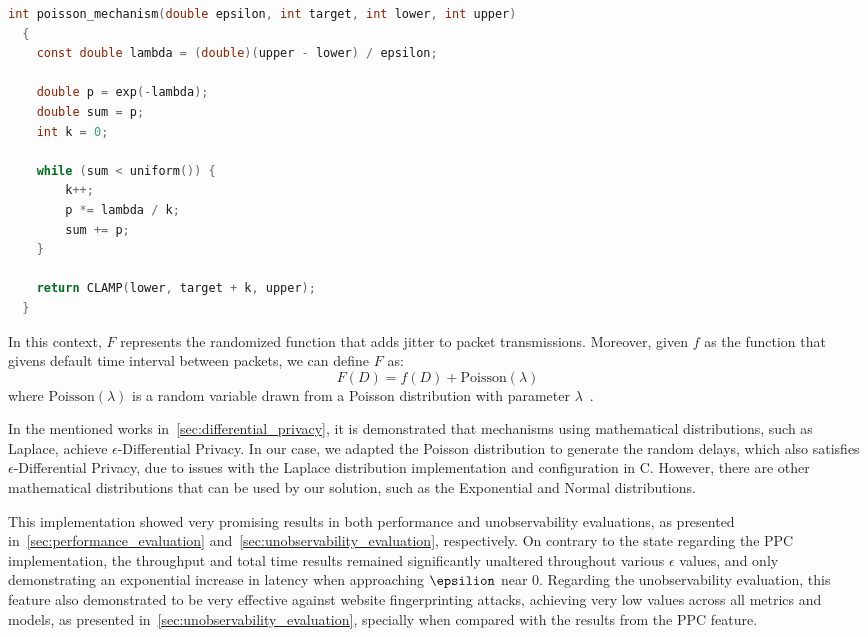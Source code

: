 \begin{lstlisting}[language=C, caption={Poisson Distribution Pseudo-Random Number Generator implementation.}, label={lst:poisson_distribution}]
  int poisson_mechanism(double epsilon, int target, int lower, int upper)
  {
    const double lambda = (double)(upper - lower) / epsilon;

    double p = exp(-lambda);
    double sum = p;
    int k = 0;

    while (sum < uniform()) {
        k++;
        p *= lambda / k;
        sum += p;
    }

    return CLAMP(lower, target + k, upper);
  }
\end{lstlisting}

In this context, $F$ represents the randomized function that adds jitter to packet transmissions. Moreover, given $f$ as the function that givens default time interval between packets, we can define $F$ as:
\[F(D) = f(D) + \text{Poisson}(\lambda)\]
where $\text{Poisson}(\lambda)$ is a random variable drawn from a Poisson distribution with parameter $\lambda$~\cite{DP_Book, AlgFoundationsDP}. 


In the mentioned works in~\autoref{sec:differential_privacy}, it is demonstrated that mechanisms using mathematical distributions, such as Laplace, achieve $\epsilon$-Differential Privacy. In our case, we adapted the Poisson distribution to generate the random delays, which also satisfies $\epsilon$-Differential Privacy, due to issues with the Laplace distribution implementation and configuration in C. However, there are other mathematical distributions that can be used by our solution, such as the Exponential and Normal distributions.

This implementation showed very promising results in both performance and unobservability evaluations, as presented in~\autoref{sec:performance_evaluation} and~\autoref{sec:unobservability_evaluation}, respectively. On contrary to the state regarding the PPC implementation, the throughput and total time results remained significantly unaltered throughout various $\epsilon$ values, and only demonstrating an exponential increase in latency when approaching $\epsilion$ near 0. Regarding the unobservability evaluation, this feature also demonstrated to be very effective against website fingerprinting attacks, achieving very low values across all metrics and models, as presented in~\autoref{sec:unobservability_evaluation}, specially when compared with the results from the PPC feature.

